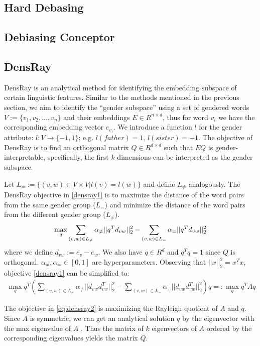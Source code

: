 \subsection{Hard Debasing}
\subsection{Debiasing Conceptor}
\subsection{DensRay}
DensRay is an analytical method for identifying the
embedding subspace of certain linguistic features. Similar to the
methods mentioned in the previous section, we aim to
identify the ``gender subspace'' using a set of gendered words
$V:=\{v_1,v_2,\dots,v_n\}$ and their embeddings $E \in
R^{n\times d}$, thus for word $v_i$ we have the
corresponding embedding vector $e_{v_i}$. We
introduce a function $l$ for the gender attribute:
$l:V\to \{-1,1\}$;
e.g. $l(father)=1$, $l(sister)=-1$. The objective of DensRay
is to find an orthogonal matrix $Q\in R^{d\times d}$ such
that $EQ$ is gender-interpretable, specifically, the first
$k$ dimensions can be interpreted as the gender subspace.

Let $L_{=}:=\{(v,w)\in V\times V|l(v)=l(w)\}$ and define
$L_{\neq}$ analogously.  The DensRay objective
in \eqref{densray1} is to maximize the distance of the word
pairs from the same gender group ($L_{=}$) and minimize the
distance of the word pairs from the different gender group
($L_{\neq}$).
\begin{eqnarray}
\max\limits_{q} 
\sum_{(v,w)\in L_{\neq}}\alpha_{\neq}||q^Td_{vw}||^2_2
-\sum_{(v,w)\in L_{=}}\alpha_{=}||q^Td_{vw}||^2_2
\eqlabel{densray1}
\end{eqnarray}
where we define $d_{vw}:=e_v-e_w$. We also have $q\in R^d$
and $q^Tq=1$ since $Q$ is orthogonal. $\alpha_{\neq},\alpha_{=}\in [0,1]$ are hyperparameters. Observing that $||x||^2_2=x^Tx$, objective \eqref{densray1} can be simplified to:
\begin{eqnarray}
\max \limits_{q} q^T(
\sum_{(v,w)\in L_{\neq}}\alpha_{\neq}||d_{vw}d_{vw}^T||^2_2-\sum_{(v,w)\in L_{=}}\alpha_{=}||d_{vw}d_{vw}^T||^2_2)q=:\max\limits_{q} q^TAq
\label{eq:densray2}
\end{eqnarray}

The objective in \eqref{eq:densray2} is maximizing the Rayleigh quotient of $A$ and $q$. Since $A$ is symmetric, we can get an analytical solution $q$ by the eigenvector with the max eigenvalue of $A$ . Thus the matrix of $k$ eigenvectors of $A$ ordered by the corresponding eigenvalues yields the matrix $Q$.

